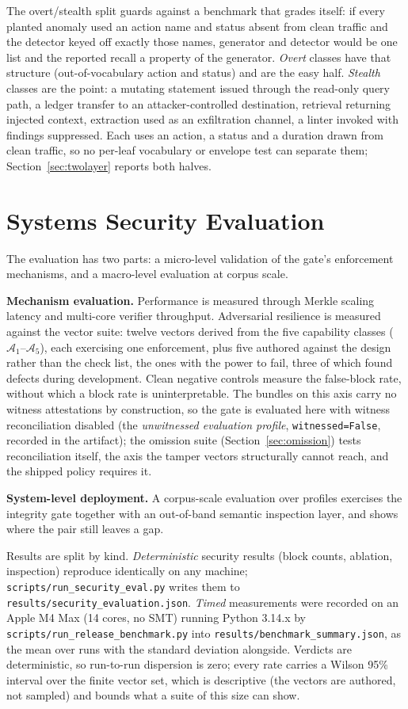 \documentclass[letterpaper,10pt,twocolumn]{article}
\theoremstyle{definition}
\begin{document}
The overt/stealth split guards against a benchmark that grades itself: if every planted anomaly used an action name and status absent from clean traffic and the detector keyed off exactly those names, generator and detector would be one list and the reported recall a property of the generator. \emph{Overt} classes have that structure (out-of-vocabulary action and status) and are the easy half. \emph{Stealth} classes are the point: a mutating statement issued through the read-only query path, a ledger transfer to an attacker-controlled destination, retrieval returning injected context, extraction used as an exfiltration channel, a linter invoked with findings suppressed. Each uses an action, a status and a duration drawn from clean traffic, so no per-leaf vocabulary or envelope test can separate them; Section~\ref{sec:twolayer} reports both halves.
\section{Systems Security Evaluation}\label{sec:eval}
The evaluation has two parts: a micro-level validation of the gate's enforcement mechanisms, and a macro-level evaluation at corpus scale.

\textbf{Mechanism evaluation.} Performance is measured through Merkle scaling latency and multi-core verifier throughput. Adversarial resilience is measured against the vector suite: twelve vectors derived from the five capability classes ($\mathcal{A}_1$--$\mathcal{A}_5$), each exercising one enforcement, plus five authored against the design rather than the check list, the ones with the power to fail, three of which found defects during development. Clean negative controls measure the false-block rate, without which a block rate is uninterpretable. The bundles on this axis carry no witness attestations by construction, so the gate is evaluated here with witness reconciliation disabled (the \emph{unwitnessed evaluation profile}, \texttt{witnessed=False}, recorded in the artifact); the omission suite (Section~\ref{sec:omission}) tests reconciliation itself, the axis the tamper vectors structurally cannot reach, and the shipped policy requires it.

\textbf{System-level deployment.} A corpus-scale evaluation over \corpusProfiles{} profiles exercises the integrity gate together with an out-of-band semantic inspection layer, and shows where the pair still leaves a gap.

Results are split by kind. \emph{Deterministic} security results (block counts, ablation, inspection) reproduce identically on any machine; \nolinkurl{scripts/run_security_eval.py} writes them to \nolinkurl{results/security_evaluation.json}. \emph{Timed} measurements were recorded on an Apple M4 Max (14 cores, no SMT) running Python 3.14.x by \nolinkurl{scripts/run_release_benchmark.py} into \nolinkurl{results/benchmark_summary.json}, as the mean over \benchRepeats{} runs with the standard deviation alongside. Verdicts are deterministic, so run-to-run dispersion is zero; every rate carries a Wilson 95\% interval over the finite vector set, which is descriptive (the vectors are authored, not sampled) and bounds what a suite of this size can show.
\end{document}
